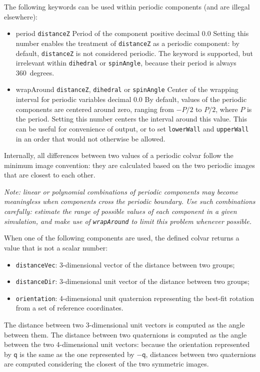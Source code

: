 The following keywords can be used within periodic components (and are
illegal elsewhere):

\begin{itemize}
\item %
  \keydef
    {period}{%
    \texttt{distanceZ}}{%
    Period of the component}{%
    positive decimal}{%
    0.0}{%
    Setting this number enables the treatment of \texttt{distanceZ} as
    a periodic component: by default, \texttt{distanceZ} is not
    considered periodic.  The keyword is supported, but irrelevant
    within \texttt{dihedral} or \texttt{spinAngle}, because their
    period is always 360~degrees.}

\item %
  \keydef
    {wrapAround}{%
    \texttt{distanceZ}, \texttt{dihedral} or \texttt{spinAngle}}{%
    Center
    of the wrapping interval for periodic variables}{%
    decimal}{%
    0.0}{%
    By default, values of the periodic components are centered around
    zero, ranging from $-P/2$ to $P/2$, where $P$ is the period.
    Setting this number centers the interval around this value.  This
    can be useful for convenience of output, or to set
    \texttt{lowerWall} and \texttt{upperWall} in an order that would
    not otherwise be allowed.}
\end{itemize}
Internally, all differences between two values of a periodic colvar
follow the minimum image convention: they are calculated based on
the two periodic images that are closest to each other.

\emph{Note: linear or polynomial combinations of periodic components
  may become meaningless when components cross the periodic boundary.
  Use such combinations carefully: estimate the range of possible values
  of each component in a given simulation, and make use of
  \texttt{wrapAround} to limit this problem whenever possible.}


When one of the following components are used, the defined colvar returns a value that is not a scalar number:
\begin{itemize}
\item \texttt{distanceVec}: 3-dimensional vector of the distance
  between two groups;
\item \texttt{distanceDir}: 3-dimensional unit vector of the distance
  between two groups;
\item \texttt{orientation}: 4-dimensional unit quaternion representing
  the best-fit rotation from a set of reference coordinates.
\end{itemize}
The distance between two 3-dimensional unit vectors is computed as the
angle between them.  The distance between two quaternions is computed
as the angle between the two 4-dimensional unit vectors: because the
orientation represented by $\mathsf{q}$ is the same as the one
represented by $-\mathsf{q}$, distances between two quaternions are
computed considering the closest of the two symmetric images.

